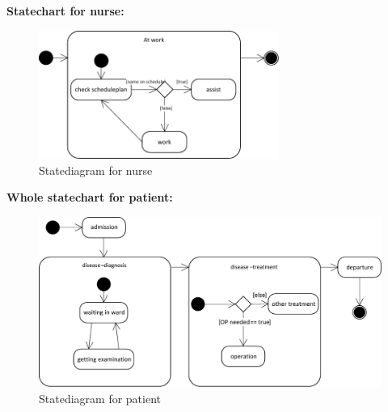  
    \textbf{Statechart for nurse:}
\begin{figure}[!htb]
  \centering  
  \includegraphics[width=0.7\textwidth]{pics/ub3/b/1b_nurse_stat} 
  \caption{Statediagram for nurse} 
  \label{fig:1b_nurse_stat} 
 \end{figure}

\newpage 
\textbf{Whole statechart for patient:}
\begin{figure}[!htb]
  \centering  
  \includegraphics[width=1\textwidth]{pics/ub3/b/1b_pat_stat} 
  \caption{Statediagram for patient}
  \label{fig:1b_pat_stat} 
 \end{figure}
 


 
